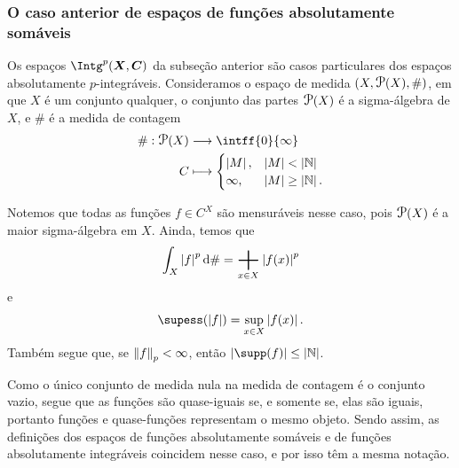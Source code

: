 \subsubsection{O caso anterior de espaços de funções absolutamente somáveis}

Os espaços $\Intg^p(\bm X,\bm C)$ da subseção anterior são casos particulares dos espaços absolutamente $p$-integráveis. Consideramos o espaço de medida $(X,\p(X),\#)$, em que $X$ é um conjunto qualquer, o conjunto das partes $\p(X)$ é a sigma-álgebra de $X$, e $\#$ é a medida de contagem
	\begin{align*}
	\func{\#}{\p(X)}{\intff{0}{\infty}}{C}{
		\begin{cases}
			\card{M},& \card{M}<\card{\N} \\
			\infty,& \card{M} \geq \card{\N}.
		\end{cases}
	}
	\end{align*}

Notemos que todas as funções $f \in C^X$ são mensuráveis nesse caso, pois $\p(X)$ é a maior sigma-álgebra em $X$.
Ainda, temos que
	\begin{equation*}
	\int_X \abs{f}^p \dd\# = \sum_{x \in X} \abs{f(x)}^p
	\end{equation*}
e
	\begin{equation*}
	\supess(\abs{f}) = \sup_{x \in X} \abs{f(x)}.
	\end{equation*}
Também segue que, se $\left\Vert{f}\right\Vert_p < \infty$, então $\card{\supp(f)} \leq \card{\N}$. 

Como o único conjunto de medida nula na medida de contagem é o conjunto vazio, segue que as funções são quase-iguais se, e somente se, elas são iguais, portanto funções e quase-funções representam o mesmo objeto. Sendo assim, as definições dos espaços de funções absolutamente somáveis e de funções absolutamente integráveis coincidem nesse caso, e por isso têm a mesma notação.


